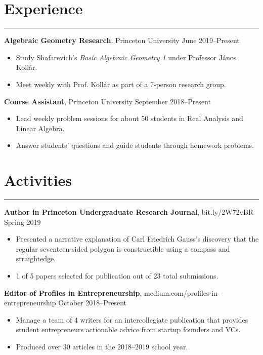 \documentclass[11pt]{article}
\newcommand{\resumesection}[1]{\vspace{-0.2cm}\section*{#1}\vspace{-0.2cm}\hrule\vspace{0.2cm}}
\begin{document}
\resumesection{Experience}

\textbf{Algebraic Geometry Research}, Princeton University \hfill June 2019--Present
\begin{itemize}
	\item Study Shafarevich's \textit{Basic Algebraic Geometry 1} under Professor J\'{a}nos Koll\'{a}r.
	\item Meet weekly with Prof. Koll\'{a}r as part of a 7-person research group.
\end{itemize}

\textbf{Course Assistant}, Princeton University \hfill September 2018--Present
\begin{itemize}
	\item Lead weekly problem sessions for about 50 students in Real Analysis and Linear Algebra.
	\item Answer students' questions and guide students through homework problems.
\end{itemize}

\resumesection{Activities}

\textbf{Author in Princeton Undergraduate Research Journal}, bit.ly/2W72vBR \hfill Spring 2019
\begin{itemize}
	\item Presented a narrative explanation of Carl Friedrich Gauss's discovery that the regular seventeen-sided polygon is constructible using a compass and straightedge.
	\item 1 of 5 papers selected for publication out of 23 total submissions.
\end{itemize}

\textbf{Editor of Profiles in Entrepreneurship}, medium.com/profiles-in-entrepreneurship \hfill October 2018--Present
\begin{itemize}
	\item Manage a team of 4 writers for an intercollegiate publication that provides student entrepreneurs actionable advice from startup founders and VCs.
	\item Produced over 30 articles in the 2018--2019 school year.
\end{itemize}
\end{document}

